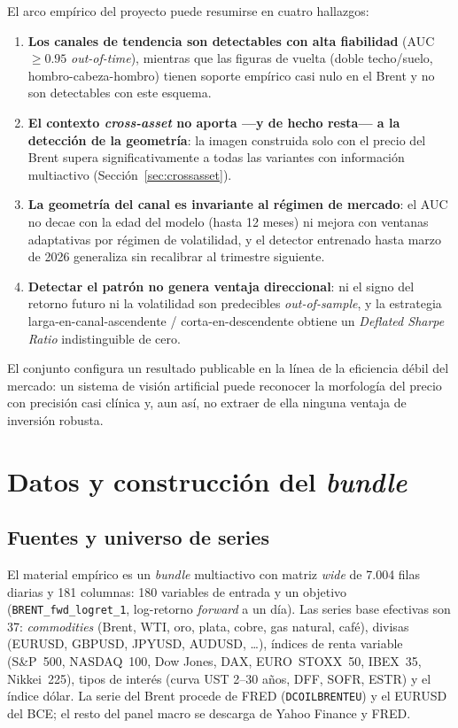 \documentclass[11pt,a4paper]{article}
\begin{document}
El arco empírico del proyecto puede resumirse en cuatro hallazgos:
\begin{enumerate}
  \item \textbf{Los canales de tendencia son detectables con alta fiabilidad}
        (AUC $\geq 0.95$ \emph{out-of-time}), mientras que las figuras de vuelta
        (doble techo/suelo, hombro-cabeza-hombro) tienen soporte empírico casi
        nulo en el Brent y no son detectables con este esquema.
  \item \textbf{El contexto \emph{cross-asset} no aporta —y de hecho resta— a la
        detección de la geometría}: la imagen construida solo con el precio del
        Brent supera significativamente a todas las variantes con información
        multiactivo (Sección~\ref{sec:crossasset}).
  \item \textbf{La geometría del canal es invariante al régimen de mercado}: el
        AUC no decae con la edad del modelo (hasta 12 meses) ni mejora con
        ventanas adaptativas por régimen de volatilidad, y el detector entrenado
        hasta marzo de 2026 generaliza sin recalibrar al trimestre siguiente.
  \item \textbf{Detectar el patrón no genera ventaja direccional}: ni el signo
        del retorno futuro ni la volatilidad son predecibles \emph{out-of-sample},
        y la estrategia larga-en-canal-ascendente / corta-en-descendente obtiene
        un \emph{Deflated Sharpe Ratio} indistinguible de cero.
\end{enumerate}

El conjunto configura un resultado publicable en la línea de la eficiencia débil
del mercado: un sistema de visión artificial puede reconocer la morfología del
precio con precisión casi clínica y, aun así, no extraer de ella ninguna ventaja
de inversión robusta.

\section{Datos y construcción del \emph{bundle}}
\subsection{Fuentes y universo de series}
El material empírico es un \emph{bundle} multiactivo con matriz \emph{wide} de
7.004 filas diarias y 181 columnas: 180 variables de entrada y un objetivo
(\texttt{BRENT\_fwd\_logret\_1}, log-retorno \emph{forward} a un día). Las series
base efectivas son 37: \emph{commodities} (Brent, WTI, oro, plata, cobre, gas
natural, café), divisas (EURUSD, GBPUSD, JPYUSD, AUDUSD, \dots), índices de renta
variable (S\&P~500, NASDAQ~100, Dow Jones, DAX, EURO~STOXX~50, IBEX~35,
Nikkei~225), tipos de interés (curva UST 2--30 años, DFF, SOFR, ESTR) y el índice
dólar. La serie del Brent procede de FRED (\texttt{DCOILBRENTEU}) y el EURUSD del
BCE; el resto del panel macro se descarga de Yahoo Finance y FRED.
\end{document}

